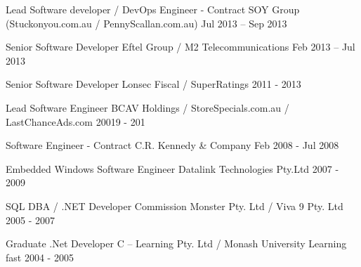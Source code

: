 \begin{cventries}
  \cventry
  {Lead Software developer / DevOps Engineer - Contract}
  {SOY Group (Stuckonyou.com.au / PennyScallan.com.au)}
  {} %
  {Jul 2013 – Sep 2013} %
  {}  %

  \cventry
  {Senior Software Developer} %
  {Eftel Group / M2 Telecommunications} %
  {} %
  {Feb 2013 – Jul 2013} %
  {}  %

  \cventry
  {Senior Software Developer} %
  {Lonsec Fiscal / SuperRatings} %
  {} %
  {2011 - 2013} %
  {}  %

  \cventry
  {Lead Software Engineer } %
  {BCAV Holdings /  StoreSpecials.com.au /  LastChanceAds.com}
  {} %
  {20019 - 201} %
  {}  %

  \cventry
  {Software Engineer - Contract} %
  {C.R. Kennedy \& Company} %
  {} %
  {Feb 2008 - Jul 2008} %
  {}  %

  \cventry
  {Embedded Windows Software Engineer} %
  {Datalink Technologies Pty.Ltd} %
  {} %
  {2007 - 2009} %
  {}  %

  \cventry
  {SQL DBA / .NET Developer} %
  {Commission Monster Pty. Ltd / Viva 9 Pty. Ltd}
  {} %
  {2005 - 2007} %
  {}  %

  \cventry
  {Graduate .Net Developer} %
  {C – Learning  Pty. Ltd / Monash University Learning fast}
  {} %
  {2004 - 2005} %
  {}  %

\end{cventries}